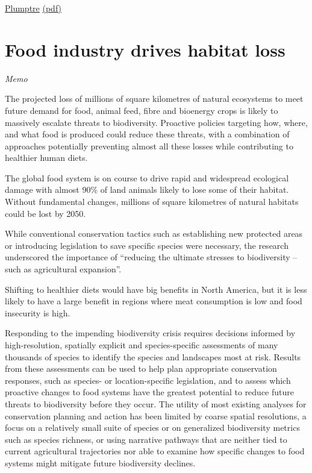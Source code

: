 \documentclass[
]{book}
\begin{document}
\href{https://www.frontiersin.org/articles/10.3389/ffgc.2021.626635/full}{Plumptre}
\href{pdf/Plumptre_2021_Ecologically_Intact_Communitiesd.pdf}{(pdf)}

\hypertarget{food-industry-drives-habitat-loss}{%
\section{Food industry drives habitat loss}\label{food-industry-drives-habitat-loss}}

\emph{Memo}

The projected loss of millions of square kilometres of natural ecosystems to meet
future demand for food, animal feed, fibre and bioenergy crops is likely to
massively escalate threats to biodiversity.
Proactive policies targeting how, where, and what food is produced could reduce these threats, with a combination of approaches potentially preventing almost all these losses while contributing to healthier human diets.

The global food system is on course to drive rapid and widespread ecological damage with almost 90\% of land animals likely to lose some of their habitat.
Without fundamental changes, millions of square kilometres of natural habitats could be lost by 2050.

While conventional conservation tactics such as establishing new protected areas
or introducing legislation to save specific species were necessary,
the research underscored the importance of ``reducing the ultimate
stresses to biodiversity -- such as agricultural expansion''.

Shifting to healthier diets would have big benefits in North America, but it is less likely to have a large benefit in regions where meat consumption is low and food insecurity is high.

Responding to the impending biodiversity crisis requires decisions informed by high-resolution,
spatially explicit and species-specific assessments of many thousands of species
to identify the species and landscapes most at risk.
Results from these assessments can be used to help plan appropriate conservation responses,
such as species- or location-specific legislation, and to assess which proactive changes
to food systems have the greatest potential to reduce future threats to biodiversity before
they occur.
The utility of most existing analyses for conservation planning and action has been limited by
coarse spatial resolutions, a focus on a relatively small suite of species or
on generalized biodiversity metrics such as species richness,
or using narrative pathways that are neither tied to current agricultural trajectories
nor able to examine how specific changes to food systems might mitigate future biodiversity declines.
\end{document}
